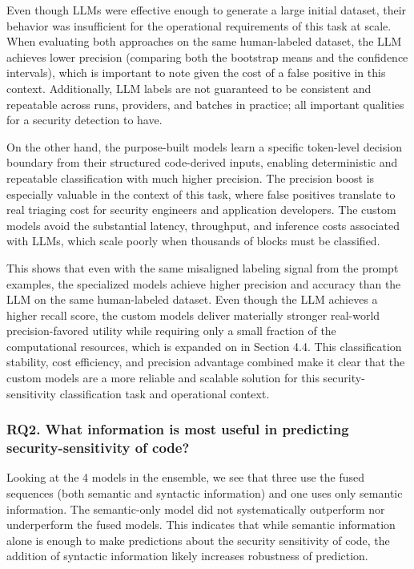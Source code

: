 \documentclass[11pt]{article}
\begin{document}
Even though LLMs were effective enough to generate a large initial
dataset, their behavior was insufficient for the operational
requirements of this task at scale. When evaluating both approaches on
the same human-labeled dataset, the LLM achieves lower
precision (comparing both the bootstrap means and the confidence
intervals), which is important to note given the cost of a false
positive in this context. Additionally, LLM labels are not guaranteed to
be consistent and repeatable across runs, providers, and batches in
practice; all important qualities for a security detection to have.

On the other hand, the purpose-built models learn a specific token-level
decision boundary from their structured code-derived inputs, enabling
deterministic and repeatable classification with much higher
precision. The precision boost is especially valuable in the context of
this task, where false positives translate to real triaging cost for
security engineers and application developers. The custom models avoid
the substantial latency, throughput, and inference costs associated with
LLMs, which scale poorly when thousands of blocks must be classified.

This shows that even with the same misaligned labeling signal from the
prompt examples, the specialized models achieve higher precision and
accuracy than the LLM on the same human-labeled dataset. Even though the
LLM achieves a higher recall score, the custom models deliver materially
stronger real-world precision-favored utility while requiring only a
small fraction of the computational resources, which is expanded on in
Section 4.4. This classification stability, cost efficiency, and
precision advantage combined make it clear that the custom models are a
more reliable and scalable solution for this security-sensitivity
classification task and operational context.

\subsubsection*{RQ2. What information is most useful in predicting security-sensitivity of code?}\label{rq2.-what-information-is-most-useful-in-predicting-security-sensitivity-of-code-1}

Looking at the 4 models in the ensemble, we see that three use the fused
sequences (both semantic and syntactic information) and one uses only
semantic information. The semantic-only model did not systematically
outperform nor underperform the fused models. This indicates that while
semantic information alone is enough to make predictions about the
security sensitivity of code, the addition of syntactic information
likely increases robustness of prediction.
\end{document}
